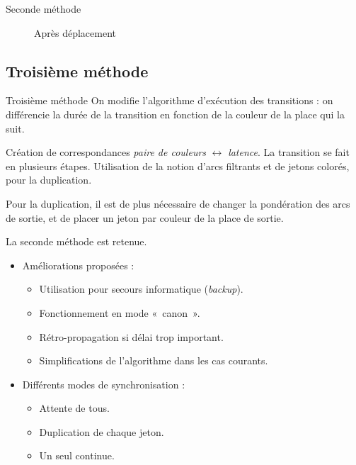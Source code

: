 \begin{frame}{Seconde méthode}
	\begin{figure}[h!]
		\centering
		\resizebox{11cm}{!}{}
		\caption{Après déplacement}
		\label{fig:deplacementMethode2-2}
	\end{figure}
\end{frame}

\subsection{Troisième méthode}
\begin{frame}{Troisième méthode}
	On modifie l'algorithme d'exécution des transitions : on différencie la durée de la transition en fonction de la couleur de la place qui la suit. 
	
	\begin{itemize}
		\itemar Création de correspondances \textit{paire de couleurs} $\leftrightarrow$ \textit{latence}.
		\itemar La transition se fait en plusieurs étapes.
		\itemar Utilisation de la notion d'arcs filtrants et de jetons colorés, pour la duplication.
	\end{itemize}
	
	Pour la duplication, il est de plus nécessaire de changer la pondération des arcs de sortie, et de placer un jeton par couleur de la place de sortie.
\end{frame}

\begin{frame}
	La seconde méthode est retenue.
	
	\begin{itemize}
		\item[\textbullet] Améliorations proposées : 
			\begin{itemize}
				\item Utilisation pour secours informatique (\textit{backup}).
				\item Fonctionnement en mode «~canon~».
				\item Rétro-propagation si délai trop important.
				\item Simplifications de l'algorithme dans les cas courants.
			\end{itemize}
		\vspace{1em}
		\item[\textbullet] Différents modes de synchronisation : 
			\begin{itemize}
				\item Attente de tous.
				\item Duplication de chaque jeton.
				\item Un seul continue.
			\end{itemize}
	\end{itemize}
\end{frame}